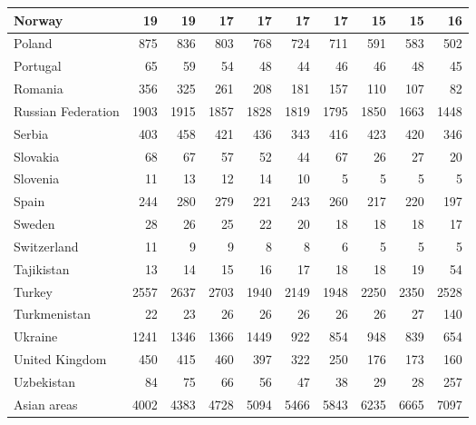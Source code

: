 \begin{table}
\begin{tabular}{|l|r|r|r|r|r|r|r|r|r|}
                        Norway&     19&     19&     17&     17&     17&     17&     15&     15&     16\\\hline
                        Poland&    875&    836&    803&    768&    724&    711&    591&    583&    502\\\hline
                      Portugal&     65&     59&     54&     48&     44&     46&     46&     48&     45\\\hline
                       Romania&    356&    325&    261&    208&    181&    157&    110&    107&     82\\\hline
            Russian Federation&   1903&   1915&   1857&   1828&   1819&   1795&   1850&   1663&   1448\\\hline
                        Serbia&    403&    458&    421&    436&    343&    416&    423&    420&    346\\\hline
                      Slovakia&     68&     67&     57&     52&     44&     67&     26&     27&     20\\\hline
                      Slovenia&     11&     13&     12&     14&     10&      5&      5&      5&      5\\\hline
                         Spain&    244&    280&    279&    221&    243&    260&    217&    220&    197\\\hline
                        Sweden&     28&     26&     25&     22&     20&     18&     18&     18&     17\\\hline
                   Switzerland&     11&      9&      9&      8&      8&      6&      5&      5&      5\\\hline
                    Tajikistan&     13&     14&     15&     16&     17&     18&     18&     19&     54\\\hline
                        Turkey&   2557&   2637&   2703&   1940&   2149&   1948&   2250&   2350&   2528\\\hline
                  Turkmenistan&     22&     23&     26&     26&     26&     26&     26&     27&    140\\\hline
                       Ukraine&   1241&   1346&   1366&   1449&    922&    854&    948&    839&    654\\\hline
                United Kingdom&    450&    415&    460&    397&    322&    250&    176&    173&    160\\\hline
                    Uzbekistan&     84&     75&     66&     56&     47&     38&     29&     28&    257\\\hline
                   Asian areas&   4002&   4383&   4728&   5094&   5466&   5843&   6235&   6665&   7097\\\hline

\end{tabular}
\end{table}
